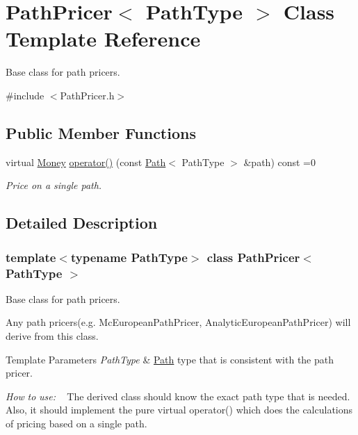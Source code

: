 \hypertarget{class_path_pricer}{}\section{Path\+Pricer$<$ Path\+Type $>$ Class Template Reference}
\label{class_path_pricer}


Base class for path pricers.  




{\ttfamily \#include $<$Path\+Pricer.\+h$>$}

\subsection*{Public Member Functions}
\begin{DoxyCompactItemize}
\item 
virtual \hyperlink{_name_def_8h_a5a9d48c16a694e9a2d9f1eca730dc8c5}{Money} \hyperlink{class_path_pricer_a14b2a03f259bb56a24a66c9b95bdcf67}{operator()} (const \hyperlink{class_path}{Path}$<$ Path\+Type $>$ \&path) const =0
\begin{DoxyCompactList}\small\item\em Price on a single path. \end{DoxyCompactList}\end{DoxyCompactItemize}


\subsection{Detailed Description}
\subsubsection*{template$<$typename Path\+Type$>$\newline
class Path\+Pricer$<$ Path\+Type $>$}

Base class for path pricers. 

Any path pricers(e.\+g. Mc\+European\+Path\+Pricer, Analytic\+European\+Path\+Pricer) will derive from this class. 
\begin{DoxyTemplParams}{Template Parameters}
{\em Path\+Type} & \hyperlink{class_path}{Path} type that is consistent with the path pricer.\\
\hline
\end{DoxyTemplParams}
{\itshape How} {\itshape to} {\itshape use\+:} ~\newline
The derived class should know the exact path type that is needed. Also, it should implement the pure virtual operator() which does the calculations of pricing based on a single path. 

